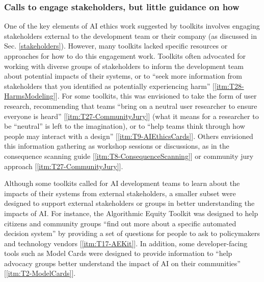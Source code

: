 \documentclass[acmsmall]{acmart}
\begin{document}
\subsubsection{Calls to engage stakeholders, but little guidance on how}
One of the key elements of AI ethics work suggested by toolkits involves engaging stakeholders external to the development team or their company (as discussed in Sec. \ref{stakeholders}). However, many toolkits lacked specific resources or approaches for how to do this engagement work. Toolkits often advocated for working with diverse groups of stakeholders to inform the development team about potential impacts of their systems, or to ``seek more information from stakeholders that you identified as potentially experiencing harm'' [\ref{itm:T28-HarmsModeling}]. For some toolkits, this was envisioned to take the form of user research, recommending that teams ``bring on a neutral user researcher to ensure everyone is heard'' [\ref{itm:T27-CommunityJury}] (what it means for a researcher to be ``neutral'' is left to the imagination), or to ``help teams think through how people may interact with a design'' [\ref{itm:T9-AIEthicsCards}]. Others envisioned this information gathering as workshop sessions or discussions, as in the consequence scanning guide [\ref{itm:T8-ConsequenceScanning}] or community jury approach [\ref{itm:T27-CommunityJury}].

Although some toolkits called for AI development teams to learn about the impacts of their systems from external stakeholders, a smaller subset were designed to support external stakeholders or groups in better understanding the impacts of AI. For instance, the Algorithmic Equity Toolkit was designed to help citizens and community groups ``find out more about a specific automated decision system'' by providing a set of questions for people to ask to policymakers and technology vendors [\ref{itm:T17-AEKit}]. In addition, some developer-facing tools such as Model Cards were designed to provide information to ``help advocacy groups better understand the impact of AI on their communities'' [\ref{itm:T2-ModelCards}]. 
\end{document}
